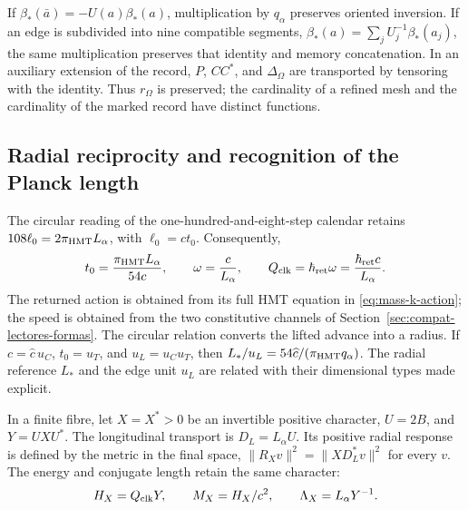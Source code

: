If \(\beta_*(\bar a)=-U(a)\beta_*(a)\), multiplication by
\(q_\alpha\) preserves oriented inversion. If an edge is
subdivided into nine compatible segments,
\(\beta_*(a)=\sum_jU_j^{-1}\beta_*(a_j)\), the same
multiplication preserves that identity and memory concatenation.
In an auxiliary extension of the record,
\(P\), \(CC^*\), and \(\Delta_\Omega\) are transported
by tensoring with the identity. Thus \(r_\Omega\) is preserved;
the cardinality of a refined mesh and the cardinality of the marked
record have distinct functions.

\subsection{Radial reciprocity and recognition of the Planck length}
\label{rev5:radial}

The circular reading of the one-hundred-and-eight-step calendar retains
\(108\ell_0=2\pi_{\rm HMT}L_\alpha\), with
\(\ell_0=ct_0\). Consequently,
\begin{equation}
 t_0=\frac{\pi_{\rm HMT}L_\alpha}{54c},\qquad
 \omega=\frac{c}{L_\alpha},\qquad
 Q_{\rm clk}=\hbar_{\rm ret}\omega
 =\frac{\hbar_{\rm ret}c}{L_\alpha}.
 \label{rev5:reloj}
\end{equation}
The returned action is obtained from its full HMT equation in
\eqref{eq:mass-k-action}; the speed is obtained from the two constitutive
channels of Section~\ref{sec:compat-lectores-formas}.
The circular relation converts the lifted advance into a radius. If
\(c=\widehat c\,u_C\), \(t_0=u_T\), and
\(u_L=u_Cu_T\), then
\(L_*/u_L=54\widehat c/(\pi_{\rm HMT}q_\alpha)\).
The radial reference \(L_*\) and the edge unit \(u_L\)
are related with their dimensional types made explicit.

In a finite fibre, let \(X=X^*>0\) be an invertible positive
character, \(U=2B\), and \(Y=UXU^*\). The longitudinal
transport is \(D_L=L_\alpha U\). Its positive radial response
is defined by the metric in the final space,
\(\|R_Xv\|^2=\|XD_L^*v\|^2\) for every \(v\).
The energy and conjugate length retain the same character:
\[
 H_X=Q_{\rm clk}Y,\qquad M_X=H_X/c^2,\qquad
 \Lambda_X=L_\alpha Y^{-1}.
\]

